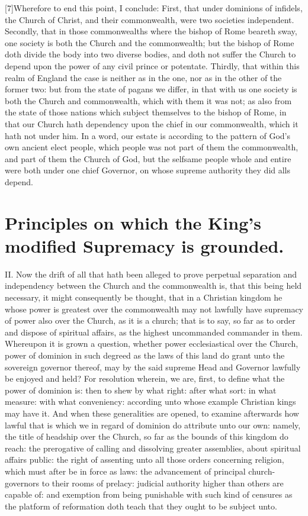 [7]Wherefore to end this point, I conclude: First, that under dominions of infidels, the Church of Christ, and their commonwealth, were two societies independent. Secondly, that in those commonwealths where the bishop of Rome beareth sway, one society is both the Church and the commonwealth; but the bishop of Rome doth divide the body into two diverse bodies, and doth not suffer the Church to depend upon the power of any civil prince or potentate. Thirdly, that within this realm of England the case is neither as in the one, nor as in the other of the former two: but from the state of pagans we differ, in that with us one society is both the Church and commonwealth, which with them it was not; as also from the state of those nations which subject themselves to the bishop of Rome, in that our Church hath dependency upon the chief in our commonwealth, which it hath not under him. In a word, our estate is according to the pattern of God’s own ancient elect people, which people was not part of them the commonwealth, and part of them the Church of God, but the selfsame people whole and entire were both under one chief Governor, on whose supreme authority they did alls depend.

\section*{Principles on which the King’s modified Supremacy is grounded.}

II. Now the drift of all that hath been alleged to prove perpetual separation and independency between the Church and the commonwealth is, that this being held necessary, it might consequently be thought, that in a Christian kingdom he whose power is greatest over the commonwealth may not lawfully have supremacy of power also over the  Church, as it is a church; that is to say, so far as to order and dispose of spiritual affairs, as the highest uncommanded commander in them. Whereupon it is grown a question, whether power ecclesiastical over the Church, power of dominion in such degreed as the laws of this land do grant unto the sovereign governor thereof, may by the said supreme Head and Governor lawfully be enjoyed and held? For resolution wherein, we are, first, to define what the power of dominion is: then to shew by what right: after what sort: in what measure: with what conveniency: according unto whose example Christian kings may have it. And when these generalities are opened, to examine afterwards how lawful that is which we in regard of dominion do attribute unto our own: namely, the title of headship over the Church, so far as the bounds of this kingdom do reach: the prerogative of calling and dissolving greater assemblies, about spiritual affairs public: the right of assenting unto all those orders concerning religion, which must after be in force as laws: the advancement of principal church-governors to their rooms of prelacy: judicial authority higher than others are capable of: and exemption from being punishable with such kind of censures as the platform of reformation doth teach that they ought to be subject unto.

